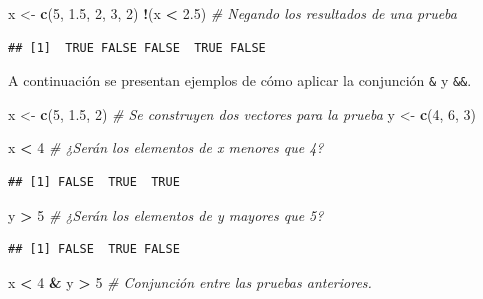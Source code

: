 \documentclass[10pt,]{krantz}
\makeatletter
\newenvironment{Shaded}{\begin{snugshade}}{\end{snugshade}}
\newcommand{\KeywordTok}[1]{\textcolor[rgb]{0.13,0.29,0.53}{\textbf{#1}}}
\newcommand{\DecValTok}[1]{\textcolor[rgb]{0.00,0.00,0.81}{#1}}
\newcommand{\FloatTok}[1]{\textcolor[rgb]{0.00,0.00,0.81}{#1}}
\newcommand{\StringTok}[1]{\textcolor[rgb]{0.31,0.60,0.02}{#1}}
\newcommand{\CommentTok}[1]{\textcolor[rgb]{0.56,0.35,0.01}{\textit{#1}}}
\newcommand{\OperatorTok}[1]{\textcolor[rgb]{0.81,0.36,0.00}{\textbf{#1}}}
\newcommand{\NormalTok}[1]{#1}
\newenvironment{kframe}{%
\medskip{}
\setlength{\fboxsep}{.8em}
 \def\at@end@of@kframe{}%
 \ifinner\ifhmode%
  \def\at@end@of@kframe{\end{minipage}}%
  \begin{minipage}{\columnwidth}%
 \fi\fi%
 \def\FrameCommand##1{\hskip\@totalleftmargin \hskip-\fboxsep
 \colorbox{shadecolor}{##1}\hskip-\fboxsep
     \hskip-\linewidth \hskip-\@totalleftmargin \hskip\columnwidth}%
 \MakeFramed {\advance\hsize-\width
   \@totalleftmargin\z@ \linewidth\hsize
   \@setminipage}}%
 {\par\unskip\endMakeFramed%
 \at@end@of@kframe}
\renewenvironment{Shaded}{\begin{kframe}}{\end{kframe}}
\makeatother
\begin{document}
\begin{Shaded}
\begin{Highlighting}[]
\NormalTok{x <-}\StringTok{ }\KeywordTok{c}\NormalTok{(}\DecValTok{5}\NormalTok{, }\FloatTok{1.5}\NormalTok{, }\DecValTok{2}\NormalTok{, }\DecValTok{3}\NormalTok{, }\DecValTok{2}\NormalTok{)}
\OperatorTok{!}\NormalTok{(x }\OperatorTok{<}\StringTok{ }\FloatTok{2.5}\NormalTok{)  }\CommentTok{# Negando los resultados de una prueba}
\end{Highlighting}
\end{Shaded}

\begin{verbatim}
## [1]  TRUE FALSE FALSE  TRUE FALSE
\end{verbatim}

A continuación se presentan ejemplos de cómo aplicar la conjunción
\texttt{\&} y \texttt{\&\&}.

\begin{Shaded}
\begin{Highlighting}[]
\NormalTok{x <-}\StringTok{ }\KeywordTok{c}\NormalTok{(}\DecValTok{5}\NormalTok{, }\FloatTok{1.5}\NormalTok{, }\DecValTok{2}\NormalTok{)  }\CommentTok{# Se construyen dos vectores para la prueba}
\NormalTok{y <-}\StringTok{ }\KeywordTok{c}\NormalTok{(}\DecValTok{4}\NormalTok{, }\DecValTok{6}\NormalTok{, }\DecValTok{3}\NormalTok{)}

\NormalTok{x }\OperatorTok{<}\StringTok{ }\DecValTok{4}  \CommentTok{# ¿Serán los elementos de x menores que 4?}
\end{Highlighting}
\end{Shaded}

\begin{verbatim}
## [1] FALSE  TRUE  TRUE
\end{verbatim}

\begin{Shaded}
\begin{Highlighting}[]
\NormalTok{y }\OperatorTok{>}\StringTok{ }\DecValTok{5}  \CommentTok{# ¿Serán los elementos de y mayores que 5?}
\end{Highlighting}
\end{Shaded}

\begin{verbatim}
## [1] FALSE  TRUE FALSE
\end{verbatim}

\begin{Shaded}
\begin{Highlighting}[]
\NormalTok{x }\OperatorTok{<}\StringTok{ }\DecValTok{4} \OperatorTok{&}\StringTok{ }\NormalTok{y }\OperatorTok{>}\StringTok{ }\DecValTok{5}  \CommentTok{# Conjunción entre las pruebas anteriores.}
\end{Highlighting}
\end{Shaded}
\end{document}
